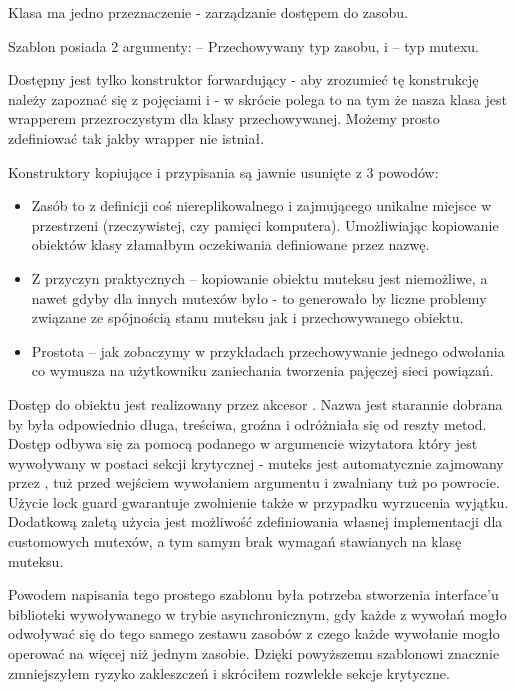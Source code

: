 
Klasa ma jedno przeznaczenie - zarządzanie dostępem do zasobu.

Szablon posiada 2 argumenty:  -- Przechowywany typ zasobu, i  -- typ mutexu.

Dostępny jest tylko konstruktor forwardujący - aby zrozumieć tę konstrukcję należy zapoznać się z pojęciami  i  - w skrócie polega to na tym że nasza klasa  jest wrapperem przezroczystym dla klasy przechowywanej. Możemy prosto zdefiniować  tak jakby wrapper  nie istniał.

Konstruktory kopiujące i przypisania są jawnie usunięte z 3 powodów:
\begin{itemize}
\item Zasób to z definicji coś niereplikowalnego i zajmującego unikalne miejsce w przestrzeni (rzeczywistej, czy pamięci komputera). Umożliwiając kopiowanie obiektów klasy  złamałbym oczekiwania definiowane przez nazwę.
\item Z przyczyn praktycznych -- kopiowanie obiektu muteksu jest niemożliwe, a nawet gdyby dla innych mutexów było - to generowało by liczne problemy związane ze spójnością stanu muteksu jak i przechowywanego obiektu.
\item Prostota -- jak zobaczymy w przykładach przechowywanie jednego odwołania co wymusza na użytkowniku zaniechania tworzenia pajęczej sieci powiązań.
\end{itemize}

Dostęp do obiektu jest realizowany przez akcesor . Nazwa jest starannie dobrana by była odpowiednio długa, treściwa, groźna i odróżniała się od reszty metod. Dostęp odbywa się za pomocą podanego w argumencie wizytatora który jest wywoływany w postaci sekcji krytycznej - muteks jest automatycznie zajmowany przez , tuż przed wejściem wywołaniem argumentu i zwalniany tuż po powrocie. Użycie lock guard gwarantuje zwolnienie także w przypadku wyrzucenia wyjątku. Dodatkową zaletą użycia  jest możliwość zdefiniowania własnej implementacji dla customowych mutexów, a tym samym brak wymagań stawianych na klasę muteksu.

Powodem napisania tego prostego szablonu była potrzeba stworzenia interface'u biblioteki wywoływanego w trybie asynchronicznym, gdy każde z wywołań mogło odwoływać się do tego samego zestawu zasobów z czego każde wywołanie mogło operować na więcej niż jednym zasobie. Dzięki powyższemu szablonowi znacznie zmniejszyłem ryzyko zakleszczeń i skróciłem rozwlekłe sekcje krytyczne.
